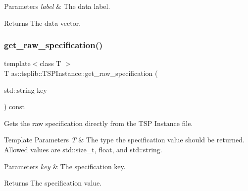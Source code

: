 \begin{DoxyParams}{Parameters}
{\em label} & The data label. \\
\hline
\end{DoxyParams}
\begin{DoxyReturn}{Returns}
The data vector. 
\end{DoxyReturn}
\mbox{\label{classas_1_1tsplib_1_1TSPInstance_a24f6eeee5dba6517265a9211da0b4962}} 
\subsubsection{\texorpdfstring{get\+\_\+raw\+\_\+specification()}{get\_raw\_specification()}}
{\footnotesize\ttfamily template$<$class T $>$ \\
T as\+::tsplib\+::\+T\+S\+P\+Instance\+::get\+\_\+raw\+\_\+specification (\begin{DoxyParamCaption}\item[{std\+::string}]{key }\end{DoxyParamCaption}) const\hspace{0.3cm}{\ttfamily [inline]}}



Gets the raw specification directly from the T\+SP Instance file. 


\begin{DoxyTemplParams}{Template Parameters}
{\em T} & The type the specification value should be returned. Allowed values are std\+::size\+\_\+t, float, and std\+::string. \\
\hline
\end{DoxyTemplParams}

\begin{DoxyParams}{Parameters}
{\em key} & The specification key. \\
\hline
\end{DoxyParams}
\begin{DoxyReturn}{Returns}
The specification value. 
\end{DoxyReturn}
\mbox{\label{classas_1_1tsplib_1_1TSPInstance_a3beae0a769669c417e8bc7d1e41a7550}} 
